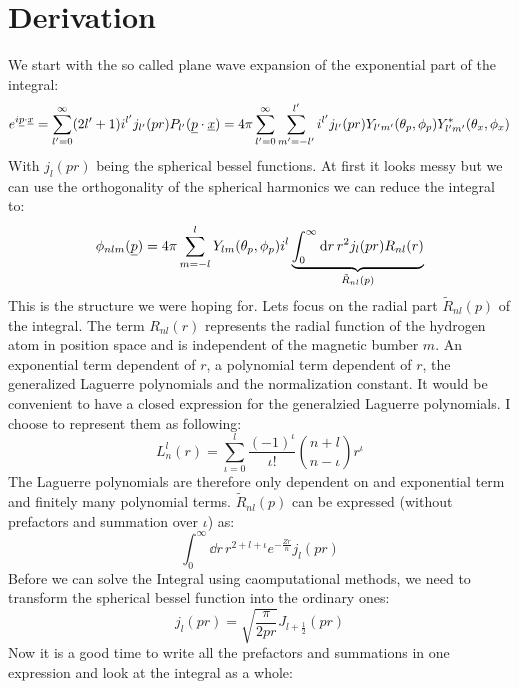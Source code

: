 \section{Derivation}
We start with the so called plane wave expansion \cite{Jackson:1998nia} of the exponential part of the integral:
\begin{equation*}
    e^{i\underline{p}\cdot\underline{x}} = \sum_{l'=0}^\infty (2l'+1)i^{l'} j_{l'}(pr) P_{l'}(\underline{p}\cdot\underline{x}) = 4\pi\sum_{l'=0}^\infty \sum_{m'=-l'}^{l'} i^{l'} j_{l'}(pr) Y_{l'm'}(\theta_p, \phi_p) Y_{l'm'}^*(\theta_x, \phi_x)
\end{equation*}
With $j_l(pr)$ being the spherical bessel functions. At first it looks messy but we can use the orthogonality of the spherical harmonics we can reduce the integral to:
\begin{equation*}
    \phi_{nlm}(\underline{p}) = 4\pi \sum_{m=-l}^{l}Y_{lm}(\theta_p,\phi_p)i^l\underbrace{\int_{0}^{\infty}\mathrm{d} r\,r^2j_l(pr)R_{nl}(r)}_{\tilde{R}_{nl}(p)}
\end{equation*}
This is the structure we were hoping for. Lets focus on the radial part $\tilde{R}_{nl}(p)$ of the integral.
The term $R_{nl}(r)$ represents the radial function of the hydrogen atom in position space and is independent of the magnetic bumber $m$. 
An exponential term dependent of $r$, a polynomial term dependent of $r$, the generalized Laguerre polynomials and the normalization constant. 
It would be convenient to have a closed expression for the generalzied Laguerre polynomials. 
I choose to represent them as following:
\begin{equation*}
    L_n^l(r) = \sum_{\iota=0}^{l} \frac{(-1)^{\iota}}{\iota!}\binom{n+l}{n-\iota}r^{\iota}
\end{equation*}
The Laguerre polynomials are therefore only dependent on and exponential term and finitely many polynomial terms. 
$\tilde{R}_{nl}(p)$ can be expressed (without prefactors and summation over $\iota$) as:
\begin{equation*}
    \int_{0}^{\infty}\dd r\,r^{2+l+\iota} e^{-\frac{Zr}{n}} j_l(pr)
\end{equation*}
Before we can solve the Integral using caomputational methods, we need to transform the spherical bessel function into the ordinary ones:
\begin{equation*}
    j_l(pr) = \sqrt{\frac{\pi}{2pr}}J_{l+\frac{1}{2}}(pr)
\end{equation*}
Now it is a good time to write all the prefactors and summations in one expression and look at the integral as a whole:
